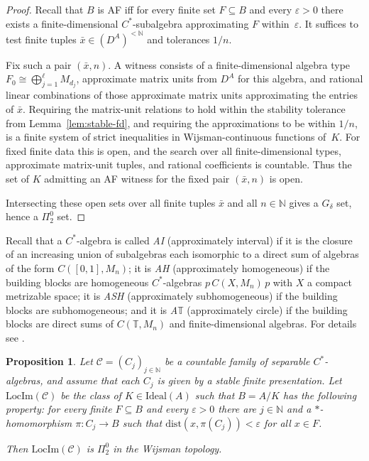 \documentclass[12pt,fleqn,a4paper]{amsart}
\numberwithin{equation}{section}
\newtheorem{proposition}[theorem]{Proposition}
\theoremstyle{definition}
\newcommand{\N}{\mathbb{N}}
\newcommand{\Ideal}{\mathrm{Ideal}}
\newcommand{\dist}{\mathrm{dist}}
\begin{document}
\begin{proof}
Recall that $B$ is AF iff for every finite set $F\subseteq B$ and every
$\varepsilon>0$ there exists a finite-dimensional $C^*$-subalgebra approximating $F$
within~$\varepsilon$.  It suffices to test finite tuples $\bar x\in(D^A)^{<\N}$ and
tolerances $1/n$.

Fix such a pair $(\bar x,n)$.  A witness consists of a finite-dimensional algebra type
$F_0\cong\bigoplus_{j=1}^\ell M_{d_j}$, approximate matrix units from $D^A$ for this
algebra, and rational linear combinations of those approximate matrix units
approximating the entries of $\bar x$.  Requiring the matrix-unit relations to hold
within the stability tolerance from Lemma~\ref{lem:stable-fd}, and requiring the
approximations to be within $1/n$, is a finite system of strict inequalities in
Wijsman-continuous functions of~$K$.  For fixed finite data this is open, and the search
over all finite-dimensional types, approximate matrix-unit tuples, and rational
coefficients is countable.  Thus the set of $K$ admitting an AF witness for the fixed
pair $(\bar x,n)$ is open.

Intersecting these open sets over all finite tuples $\bar x$ and all $n\in\N$ gives a
$G_\delta$ set, hence a $\Pi^0_2$ set.
\end{proof}

Recall that a $C^*$-algebra is called \emph{AI} (approximately interval) if it is the
closure of an increasing union of subalgebras each isomorphic to a direct sum of
algebras of the form $C([0,1],M_n)$; it is \emph{AH} (approximately homogeneous)
if the building blocks are homogeneous $C^*$-algebras $p\,C(X,M_n)\,p$ with $X$ a
compact metrizable space; it is \emph{ASH} (approximately sub\-homogeneous) if the
building blocks are subhomogeneous; and it is \emph{A$\mathbb T$} (approximately circle)
if the building blocks are direct sums of $C(\mathbb T,M_n)$ and finite-dimensional
algebras.  For details see \cite[IV.3]{BlackadarOA}.

\begin{proposition}
\label{prop:AI-AH}
Let $\mathcal C=(C_j)_{j\in\N}$ be a countable family of separable $C^*$-algebras,
and assume that each $C_j$ is given by a stable finite presentation.  Let
$\mathrm{LocIm}(\mathcal C)$ be the class of $K\in\Ideal(A)$ such that $B=A/K$ has the
following property: for every finite $F\subseteq B$ and every $\varepsilon>0$ there are
$j\in\N$ and a $*$-homomorphism $\pi:C_j\to B$ such that
$\dist(x,\pi(C_j))<\varepsilon$ for all $x\in F$.

Then $\mathrm{LocIm}(\mathcal C)$ is $\Pi^0_2$ in the Wijsman topology.
\end{proposition}
\end{document}
